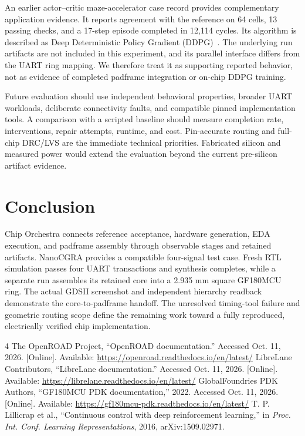 \documentclass[conference,letterpaper]{IEEEtran}
\begin{document}
An earlier actor--critic maze-accelerator case record provides complementary application evidence. It reports agreement with the reference on 64 cells, 13 passing checks, and a 17-step episode completed in 12,114 cycles. Its algorithm is described as Deep Deterministic Policy Gradient (DDPG)~\cite{ddpg}. The underlying run artifacts are not included in this experiment, and its parallel interface differs from the UART ring mapping. We therefore treat it as supporting reported behavior, not as evidence of completed padframe integration or on-chip DDPG training.

Future evaluation should use independent behavioral properties, broader UART workloads, deliberate connectivity faults, and compatible pinned implementation tools. A comparison with a scripted baseline should measure completion rate, interventions, repair attempts, runtime, and cost. Pin-accurate routing and full-chip DRC/LVS are the immediate technical priorities. Fabricated silicon and measured power would extend the evaluation beyond the current pre-silicon artifact evidence.

\section{Conclusion}
Chip Orchestra connects reference acceptance, hardware generation, EDA execution, and padframe assembly through observable stages and retained artifacts. NanoCGRA provides a compatible four-signal test case. Fresh RTL simulation passes four UART transactions and synthesis completes, while a separate run assembles its retained core into a 2.935 mm square GF180MCU ring. The actual GDSII screenshot and independent hierarchy readback demonstrate the core-to-padframe handoff. The unresolved timing-tool failure and geometric routing scope define the remaining work toward a fully reproduced, electrically verified chip implementation.

\begin{thebibliography}{4}
 The OpenROAD Project, ``OpenROAD documentation.'' Accessed Oct. 11, 2026. [Online]. Available: \url{https://openroad.readthedocs.io/en/latest/}
 LibreLane Contributors, ``LibreLane documentation.'' Accessed Oct. 11, 2026. [Online]. Available: \url{https://librelane.readthedocs.io/en/latest/}
 GlobalFoundries PDK Authors, ``GF180MCU PDK documentation,'' 2022. Accessed Oct. 11, 2026. [Online]. Available: \url{https://gf180mcu-pdk.readthedocs.io/en/latest/}
 T. P. Lillicrap et al., ``Continuous control with deep reinforcement learning,'' in \emph{Proc. Int. Conf. Learning Representations}, 2016, arXiv:1509.02971.
\end{thebibliography}
\end{document}
